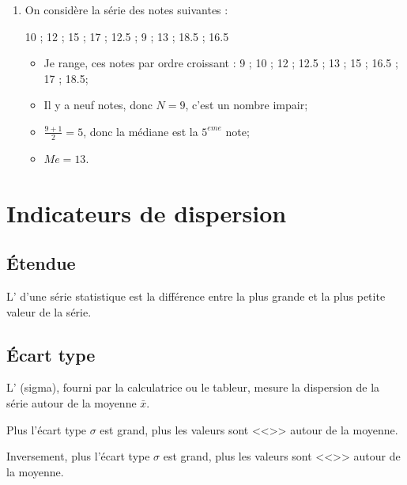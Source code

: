 \documentclass[12pt,a4paper]{article}
\begin{document}
\begin{myexs}
	\begin{enumerate}
		\item On considère la série des notes suivantes : 
		
		\num{10} ; \num{12} ; \num{15} ; \num{17} ; \num{12.5} ; \num{9} ; \num{13} ; \num{18.5} ; \num{16.5}
		
		\begin{itemize}
			\item Je range, ces notes par ordre croissant :
			\num{9} ; \num{10} ; \num{12} ; \num{12.5} ; \num{13} ; \num{15} ; \num{16.5} ; \num{17} ; \num{18.5};
			
			\item Il y a neuf notes, donc $N = 9$, c'est un nombre impair;
			\item $\frac{9+1}{2} = 5$, donc la médiane est la $5^{eme}$ note;
			\item $Me = 13$.
		\end{itemize}
		
	\end{enumerate}
\end{myexs}

\section{Indicateurs de dispersion}

\subsection{\'Etendue}

\begin{mydef}
	L' d'une série statistique est la différence entre la plus grande et la plus petite valeur de la série.
\end{mydef}	

\subsection{\'Ecart type}

\begin{mydef}
	L' (sigma), fourni par la calculatrice ou le tableur, mesure la dispersion de la série autour de la moyenne $\bar{x}$. 
	
	Plus l'écart type $\sigma$ est grand, plus les valeurs sont <<>> autour de la moyenne. 
	
	Inversement, plus l'écart type $\sigma$ est grand, plus les valeurs sont <<>> autour de la moyenne.
\end{mydef}	
\end{document}
